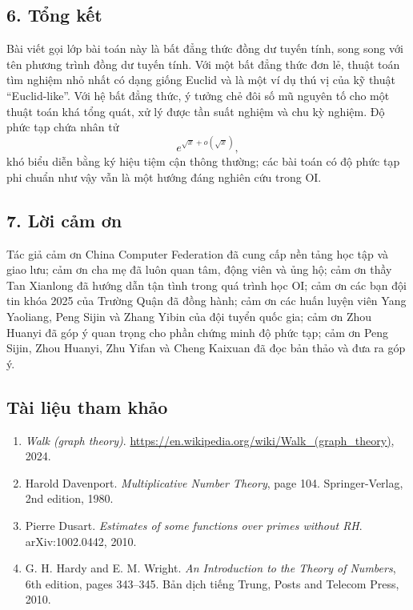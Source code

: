 \documentclass[11pt]{article}
\begin{document}
\subsection*{6. Tổng kết}

Bài viết gọi lớp bài toán này là bất đẳng thức đồng dư tuyến tính, song song
với tên phương trình đồng dư tuyến tính. Với một bất đẳng thức đơn lẻ, thuật
toán tìm nghiệm nhỏ nhất có dạng giống Euclid và là một ví dụ thú vị của kỹ
thuật ``Euclid-like''. Với hệ bất đẳng thức, ý tưởng chẻ đôi số mũ nguyên tố
cho một thuật toán khá tổng quát, xử lý được tần suất nghiệm và chu kỳ nghiệm.
Độ phức tạp chứa nhân tử
\[
  e^{\sqrt x+o(\sqrt x)},
\]
khó biểu diễn bằng ký hiệu tiệm cận thông thường; các bài toán có độ phức tạp
phi chuẩn như vậy vẫn là một hướng đáng nghiên cứu trong OI.

\subsection*{7. Lời cảm ơn}

Tác giả cảm ơn China Computer Federation đã cung cấp nền tảng học tập và giao
lưu; cảm ơn cha mẹ đã luôn quan tâm, động viên và ủng hộ; cảm ơn thầy Tan
Xianlong đã hướng dẫn tận tình trong quá trình học OI; cảm ơn các bạn đội tin
khóa 2025 của Trường Quận đã đồng hành; cảm ơn các huấn luyện viên Yang
Yaoliang, Peng Sijin và Zhang Yibin của đội tuyển quốc gia; cảm ơn Zhou Huanyi
đã góp ý quan trọng cho phần chứng minh độ phức tạp; cảm ơn Peng Sijin, Zhou
Huanyi, Zhu Yifan và Cheng Kaixuan đã đọc bản thảo và đưa ra góp ý.

\subsection*{Tài liệu tham khảo}

\begin{enumerate}
  \item \emph{Walk (graph theory)}. \url{https://en.wikipedia.org/wiki/Walk_(graph_theory)}, 2024.
  \item Harold Davenport. \emph{Multiplicative Number Theory}, page 104.
  Springer-Verlag, 2nd edition, 1980.
  \item Pierre Dusart. \emph{Estimates of some functions over primes without
  RH}. arXiv:1002.0442, 2010.
  \item G. H. Hardy and E. M. Wright. \emph{An Introduction to the Theory of
  Numbers}, 6th edition, pages 343--345. Bản dịch tiếng Trung, Posts and
  Telecom Press, 2010.
\end{enumerate}
\end{document}
